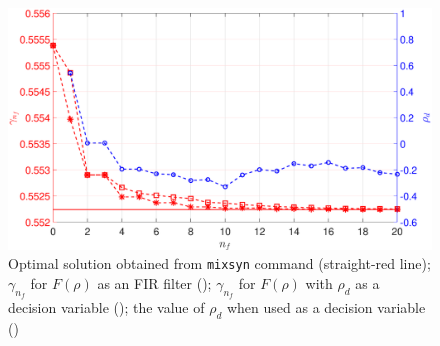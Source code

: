 \documentclass[letterpaper, 10 pt, conference]{ieeeconf}  %
\begin{document}
\begin{figure}
\centering
\includegraphics[width=\columnwidth]{../pics/gamma_convergence.eps}
\caption{Optimal solution obtained from \texttt{mixsyn} command (straight-red line); $\gamma_{n_f}$ for $F(\rho)$ as an FIR filter ({\color{red}{- -$\square$- -}});  $\gamma_{n_f}$ for $F(\rho)$ with $\rho_d$ as a decision variable ({\color{red}{- -$*$- -}}); the value of $\rho_d$ when used as a decision variable  ({\color{blue}{- -$\circ$- -}}) }
\label{fig:ex2}
\end{figure}
\end{document}
